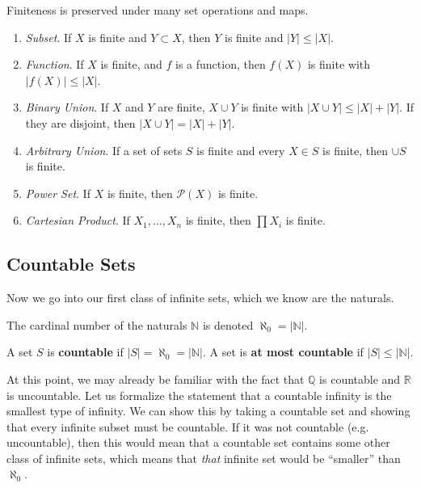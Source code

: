   \begin{theorem}
    Finiteness is preserved under many set operations and maps. 
    \begin{enumerate}
      \item \textit{Subset}. If $X$ is finite and $Y \subset X$, then $Y$ is finite and $|Y| \leq |X|$. 
      \item \textit{Function}. If $X$ is finite, and $f$ is a function, then $f(X)$ is finite with $|f(X)| \leq |X|$. 
      \item \textit{Binary Union}. If $X$ and $Y$ are finite, $X \cup Y$ is finite with $|X \cup Y| \leq |X| + |Y|$.  If they are disjoint, then $|X \cup Y| = |X| + |Y|$. 
      \item \textit{Arbitrary Union}. If a set of sets $S$ is finite and every $X \in S$ is finite, then $\cup S$ is finite. 
      \item \textit{Power Set}. If $X$ is finite, then $\mathcal{P}(X)$ is finite. 
      \item \textit{Cartesian Product}. If $X_1, \ldots, X_n$ is finite, then $\prod X_i$ is finite. 
    \end{enumerate}
  \end{theorem}

\subsection{Countable Sets}

  Now we go into our first class of infinite sets, which we know are the naturals. 

  \begin{definition}
    The cardinal number of the naturals $\mathbb{N}$ is denoted $\aleph_0 = |\mathbb{N}|$. 
  \end{definition}

  \begin{definition}
    A set $S$ is \textbf{countable} if $|S| = \aleph_0 = |\mathbb{N}|$. A set is \textbf{at most countable} if $|S| \leq |\mathbb{N}|$. 
  \end{definition} 

  At this point, we may already be familiar with the fact that $\mathbb{Q}$ is countable and $\mathbb{R}$ is uncountable. Let us formalize the statement that a countable infinity is the smallest type of infinity. We can show this by taking a countable set and showing that every infinite subset must be countable. If it was not countable (e.g. uncountable), then this would mean that a countable set contains some other class of infinite sets, which means that \textit{that} infinite set would be ``smaller'' than $\aleph_0$. 

